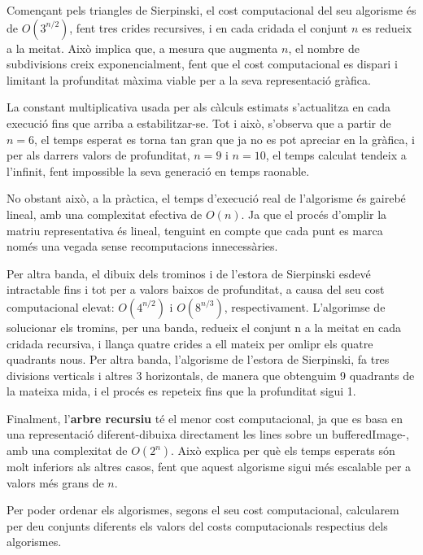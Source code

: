 \documentclass{ieeetj}
\begin{document}
Començant pels triangles de Sierpinski, el cost computacional del seu algorisme és de \( O(3^{n/2}) \), fent tres crides recursives, i en cada cridada el conjunt \( n \) es redueix a la meitat. Això implica que, a mesura que augmenta \( n \), el nombre de subdivisions creix exponencialment, fent que el cost computacional es dispari i limitant la profunditat màxima viable per a la seva representació gràfica.\newline

La constant multiplicativa usada per als càlculs estimats s'actualitza en cada execució fins que arriba a estabilitzar-se. Tot i això, s'observa que a partir de \( n = 6 \), el temps esperat es torna tan gran que ja no es pot apreciar en la gràfica, i per als  darrers valors de profunditat, \( n = 9 \) i \( n = 10 \), el temps calculat tendeix a l'infinit, fent impossible la seva generació en temps raonable.

No obstant això, a la pràctica, el temps d'execució real de l'algorisme és gairebé lineal, amb una complexitat efectiva de \( O(n) \). Ja que el procés d'omplir la matriu representativa és lineal, tenguint en compte que cada punt es marca només una vegada sense recomputacions innecessàries.\newline

Per altra banda, el dibuix dels trominos i de l'estora de Sierpinski esdevé intractable fins i tot per a valors baixos de profunditat, a causa del seu cost computacional elevat: \( O(4^{n/2}) \) i \( O(8^{n/3}) \), respectivament. L'algorimse de solucionar els tromins, per una banda, redueix el conjunt n a la meitat en cada cridada recursiva, i llança quatre crides a ell mateix per omlipr els  quatre quadrants nous. Per altra banda, l'algorisme de l'estora de Sierpinski, fa tres divisions verticals i altres 3 horizontals, de manera que obtenguim 9 quadrants de la mateixa mida, i el procés es repeteix fins que la profunditat sigui 1.\newline 

Finalment, l'\textbf{arbre recursiu} té el menor cost computacional, ja que es basa en una representació diferent-dibuixa directament les lines sobre un bufferedImage-, amb una complexitat de \( O(2^n) \). Això explica per què els temps esperats són molt inferiors als altres casos, fent que aquest algorisme sigui més escalable per a valors més grans de \( n \).\newline

Per poder ordenar els algorismes, segons el seu cost computacional, calcularem per deu conjunts diferents els valors del costs computacionals respectius dels algorismes.
\end{document}
